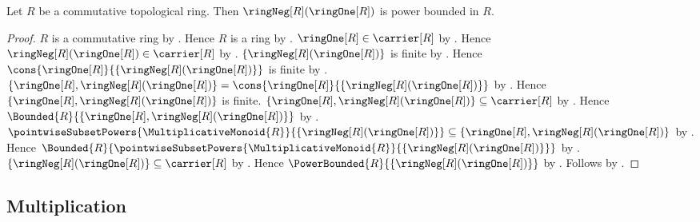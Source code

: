 \begin{theorem}\label{ring_negative_one_power_bounded}
    Let $R$ be a commutative topological ring.
    Then $\ringNeg[R](\ringOne[R])$ is power bounded in $R$.
\end{theorem}
\begin{proof}
    $R$ is a commutative ring by
        .
    Hence $R$ is a ring by .
    $\ringOne[R]\in\carrier[R]$ by .
    Hence $\ringNeg[R](\ringOne[R])\in\carrier[R]$ by .
    $\{\ringNeg[R](\ringOne[R])\}$ is finite by
        .
    Hence $\cons{\ringOne[R]}{\{\ringNeg[R](\ringOne[R])\}}$ is finite by
        .
    $\{\ringOne[R],\ringNeg[R](\ringOne[R])\}
        =\cons{\ringOne[R]}{\{\ringNeg[R](\ringOne[R])\}}$ by
        .
    Hence $\{\ringOne[R],\ringNeg[R](\ringOne[R])\}$ is finite.
    $\{\ringOne[R],\ringNeg[R](\ringOne[R])\}\subseteq\carrier[R]$ by
        .
    Hence $\Bounded{R}{\{\ringOne[R],\ringNeg[R](\ringOne[R])\}}$ by
        .
    $\pointwiseSubsetPowers{\MultiplicativeMonoid{R}}{
        \{\ringNeg[R](\ringOne[R])\}}
        \subseteq\{\ringOne[R],\ringNeg[R](\ringOne[R])\}$ by
        .
    Hence $\Bounded{R}{\pointwiseSubsetPowers{
        \MultiplicativeMonoid{R}}{\{\ringNeg[R](\ringOne[R])\}}}$ by
        .
    $\{\ringNeg[R](\ringOne[R])\}\subseteq\carrier[R]$ by
        .
    Hence $\PowerBounded{R}{\{\ringNeg[R](\ringOne[R])\}}$ by
        .
    Follows by .
\end{proof}

\subsection{Multiplication}

